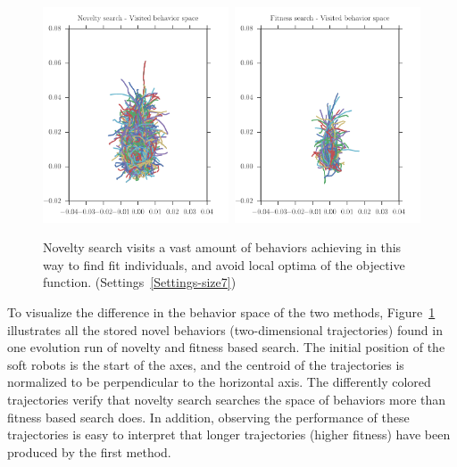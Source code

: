 \begin{figure}[t!]
\centering
\includegraphics[width=0.49\textwidth]{../Figures/Behaviors/behaviorsNovelty.pdf}\	
\includegraphics[width=0.49\textwidth]{../Figures/Behaviors/behaviorsFitness.pdf}
\caption{Novelty search visits a vast amount of behaviors achieving in this way to find fit individuals, and avoid local optima of the objective function. (Settings~\ref{Settings-size7})}
\label{fig:behaviorSpaceDiversity}
\end{figure}
To visualize the difference in the behavior space of the two methods, Figure~\ref{fig:behaviorSpaceDiversity} illustrates all the stored novel behaviors (two-dimensional trajectories) found in one evolution run of novelty and fitness based search. The initial position of the soft robots is the start of the axes, and the centroid of the trajectories is normalized to be perpendicular to the horizontal axis. The differently colored trajectories verify that novelty search searches the space of behaviors more than fitness based search does. In addition, observing the performance of these trajectories is easy to interpret that longer trajectories (higher fitness) have been produced by the first method. 

